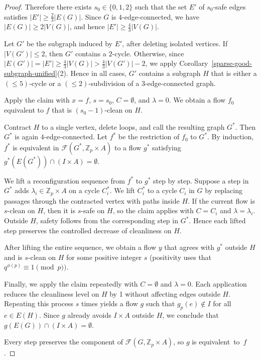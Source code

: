 \documentclass[a4paper,12pt]{article}
\theoremstyle{plain}
\theoremstyle{definition}
\renewcommand\le\leqslant
\renewcommand\ge\geqslant
\begin{document}
\begin{proof}
Therefore there exists $s_0\in\{0,1,2\}$ such that the set $E'$ of $s_0$-safe edges satisfies $|E'|\ge \frac{2}{3}|E(G)|$. Since $G$ is $4$-edge-connected, we have $|E(G)|\ge 2|V(G)|$, and hence $|E'|\ge \frac{4}{3}|V(G)|$.

Let $G'$ be the subgraph induced by $E'$, after deleting isolated vertices. If $|V(G')|\le 2$, then $G'$ contains a $2$-cycle. Otherwise, since $|E(G')|=|E'|\ge \frac{4}{3}|V(G)|>\frac{4}{3}|V(G')|-2$, we apply Corollary~\ref{sparse-good-subgraph-unified}(2). Hence in all cases, $G'$ contains a subgraph $H$ that is either a $(\le 5)$-cycle or a $(\le 2)$-subdivision of a $3$-edge-connected graph.

Apply the claim with $x=f$, $s=s_0$, $C=\emptyset$, and $\lambda=0$. We obtain a flow $f_0$ equivalent to $f$ that is $(s_0-1)$-clean on $H$.

Contract $H$ to a single vertex, delete loops, and call the resulting graph $G^*$. Then $G^*$ is again $4$-edge-connected. Let $f^*$ be the restriction of $f_0$ to $G^*$. By induction, $f^*$ is equivalent in $\mathcal{F}(G^*,\mathbb{Z}_p\times A)$ to a flow $g^*$ satisfying $g^*(E(G^*))\cap (I\times A)=\emptyset$.

We lift a reconfiguration sequence from $f^*$ to $g^*$ step by step. Suppose a step in $G^*$ adds $\lambda_i\in\mathbb{Z}_p\times A$ on a cycle $C_i^*$. We lift $C_i^*$ to a cycle $C_i$ in $G$ by replacing passages through the contracted vertex with paths inside $H$. If the current flow is $s$-clean on $H$, then it is $s$-safe on $H$, so the claim applies with $C=C_i$ and $\lambda=\lambda_i$. Outside $H$, safety follows from the corresponding step in $G^*$. Hence each lifted step preserves the controlled decrease of cleanliness on $H$.

After lifting the entire sequence, we obtain a flow $y$ that agrees with $g^*$ outside $H$ and is $s$-clean on $H$ for some positive integer $s$ (positivity uses that $q^{\phi(p)}\equiv1\pmod p)$.

Finally, we apply the claim repeatedly with $C=\emptyset$ and $\lambda=0$. Each application reduces the cleanliness level on $H$ by 1 without affecting edges outside $H$. Repeating this process $s$ times yields a flow $g$ such that $g_p(e)\notin I$ for all $e\in E(H)$. Since $g$ already avoids $I\times A$ outside $H$, we conclude that $g(E(G))\cap (I\times A)=\emptyset$.

Every step preserves the component of $\mathcal{F}(G,\mathbb{Z}_p\times A)$, so $g$ is equivalent~to~$f$. 
\end{proof}
\end{document}
